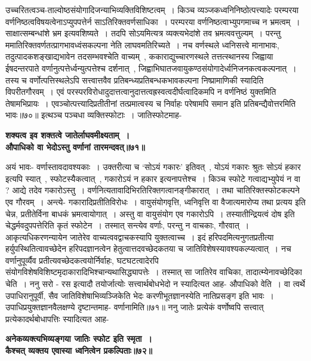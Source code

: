 {{{{उच्चरितत्वञ्च-ताल्वोष्ठसंयोगादिजन्याभिव्यक्तिविशिष्टत्वम्~।
किञ्च व्यञ्जकध्वनिनिष्ठोत्पत्त्यादेः परम्परया वर्णनिष्ठत्वविषयत्वेनाऽप्युपपत्तेर्न साऽतिरिक्तवर्णसाधिका~।
परम्परया वर्णनिष्ठत्वाभ्युपगमाच्च न भ्रमत्वम्~।
साक्षात्सम्बन्धांशे भ्रम इत्यवशिष्यते~।
तदपि सोऽयमित्यत्र व्यक्त्यभेदांशे तव भ्रमत्ववत्तुल्यम्~।
परन्तु ममातिरिक्तवर्णतत्प्रागभावध्वंसकल्पना नेति लाघवमतिरिच्यते~।
नच वर्णस्थले ध्वनिसत्त्वे मानाभावः, तदुत्पादकशङ्खाद्यभावेन तदसम्भवश्चेति वाच्यम्~, ककाराद्युच्चारणस्थले तत्तत्स्थानस्य जिह्वाया ईषदन्तरपाते वर्णानुत्पत्तेर्ध्वन्युत्पत्तेश्च दर्शनात्~, जिह्वाभिघातजवायुकण्ठसंयोगादेर्ध्वनिजनकत्वकल्पनात्~।
तस्य च वर्णोत्पत्तिस्थलेऽपि सत्त्वात्तवैव प्रतिबन्ध्यप्रतिबन्धकभावकल्पना निष्प्रामाणिकी स्यादिति विपरीतगौरवम्~।
एवं परस्परविरोधादुदात्तत्वानुदात्तत्वह्रस्वत्वदीर्घत्वादिकमपि न वर्णनिष्ठं युक्तमिति तेषामभिप्रायः~।
एवञ्चोत्पत्त्यादिप्रतीतीनां तत्प्रमात्वस्य च निर्वाहः परेषामपि समान इति प्रतिबन्द्यैवोत्तरमिति भावः॥७०॥
 इत्थञ्च पञ्चधा व्यक्तिस्फोटाः~।
जातिस्फोटमाह-
\begin{center}{\bfseries शक्यत्व इव शक्तत्वे जातेर्लाघवमीक्ष्यताम्~।\\
औपाधिको वा भेदोऽस्तु वर्णानां तारमन्दवत्॥७१॥}\end{center}
 अयं भावः- वर्णास्तावदावश्यकाः~।
उक्तरीत्या च `सोऽयं गकारः' इतिवत्~, योऽयं गकारः श्रुतः सोऽयं हकार इत्यपि स्यात्~, स्फोटस्यैकत्वात्~, गकारोऽयं न हकार इत्यनापत्तेश्च~।
किञ्च स्फोटे गत्वाद्यभ्युपेयं न वा ? आद्ये तदेव गकारोऽस्तु~।
वर्णनित्यतावादिभिरतिरिक्तगत्वानङ्गीकारात्~।
तथा चातिरिक्तस्फोटकल्पने एव गौरवम्~।
अन्त्ये- गकारादिप्रतीतिविरोधः~।
वायुसंयोगवृत्ति, ध्वनिवृत्ति वा वैजात्यमारोप्य तथा प्रत्यय इति चेन्न, प्रतीतेर्विना बाधकं भ्रमत्वायोगात्~।
अस्तु वा वायुसंयोग एव गकारोऽपि~।
तस्यातीन्द्रियत्वं दोष इति चेद्धर्मवदुपपत्तेरिति कृतं स्फोटेन~।
तस्मात् सन्त्येव वर्णाः, परन्तु न वाचकाः, गौरवात्~।
आकृत्यधिकरणन्यायेन जातेरेव वाच्यत्ववद्वाचकस्यापि युक्तत्वाच्च~।
इदं हरिपदमित्यनुगतप्रतीत्या हर्युपस्थितित्वावच्छेदेन हरिपदज्ञानत्वेन हेतुत्वात्तदवच्छेदकतया च जातिविशेषस्यावश्यकल्प्यत्वात्~।
नच वर्णानुपूर्व्यैव प्रतीत्यवच्छेदकत्वयोर्निर्वाहः, घटघटत्वादेरपि संयोगविशेषविशिष्टमृदाकारादिभिश्चान्यथासिद्ध्यापत्तेः~।
तस्मात् सा जातिरेव वाचिका, तादात्म्येनावच्छेदिका चेति~।
ननु सरो - रस इत्यादौ तयोर्जात्योः सत्त्वार्थबोधभेदो न स्यादित्यत आह- औपाधिको वेति~।
वा त्वर्थे उपाधिरानुपूर्वी, सैव जातिविशेषाभिव्यञ्जिकेति भेदः करणीभूतज्ञानस्येति नातिप्रसङ्ग इति भावः~।
उपाधिप्रयुक्तज्ञानवैलक्षण्ये दृष्टान्तमाह- वर्णानामिति॥७१॥
ननु जातेः प्रत्येकं वर्णोष्वपि सत्त्वात् प्रत्येकादर्थबोधापत्तिः स्यादित्यत आह-
\begin{center}{\bfseries अनेकव्यक्त्यभिव्यङ्गया जातिः स्फोट इति स्मृता~।\\
कैश्चत् व्यक्तय एवास्या ध्वनित्वेन प्रकल्पिताः॥७२॥}\end{center}
}}}}
